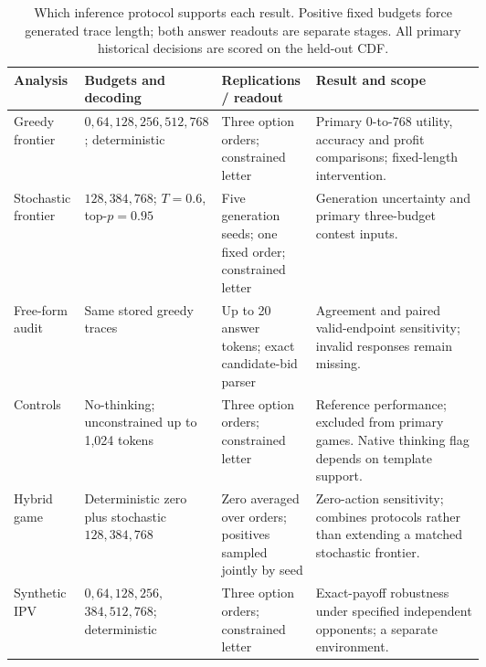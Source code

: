 \begin{table}[htbp]
\centering\footnotesize
\caption{Which inference protocol supports each result. Positive fixed budgets force generated trace length; both answer readouts are separate stages. All primary historical decisions are scored on the held-out CDF.}
\label{tab:protocolmap}
\setlength{\tabcolsep}{4pt}
\begin{tabularx}{\linewidth}{@{}p{0.15\linewidth}p{0.25\linewidth}p{0.20\linewidth}X@{}}
\toprule
Analysis & Budgets and decoding & Replications / readout & Result and scope \\
\midrule
Greedy frontier & $0,64,128,256,512,768$; deterministic & Three option orders; constrained letter & Primary 0-to-768 utility, accuracy and profit comparisons; fixed-length intervention. \\
Stochastic frontier & $128,384,768$; $T=0.6$, top-$p=0.95$ & Five generation seeds; one fixed order; constrained letter & Generation uncertainty and primary three-budget contest inputs. \\
Free-form audit & Same stored greedy traces & Up to 20 answer tokens; exact candidate-bid parser & Agreement and paired valid-endpoint sensitivity; invalid responses remain missing. \\
Controls & No-thinking; unconstrained up to 1,024 tokens & Three option orders; constrained letter & Reference performance; excluded from primary games. Native thinking flag depends on template support. \\
Hybrid game & Deterministic zero plus stochastic $128,384,768$ & Zero averaged over orders; positives sampled jointly by seed & Zero-action sensitivity; combines protocols rather than extending a matched stochastic frontier. \\
Synthetic IPV & $0,64,128,256,$\newline $384,512,768$; deterministic & Three option orders; constrained letter & Exact-payoff robustness under specified independent opponents; a separate environment. \\
\bottomrule
\end{tabularx}
\end{table}
